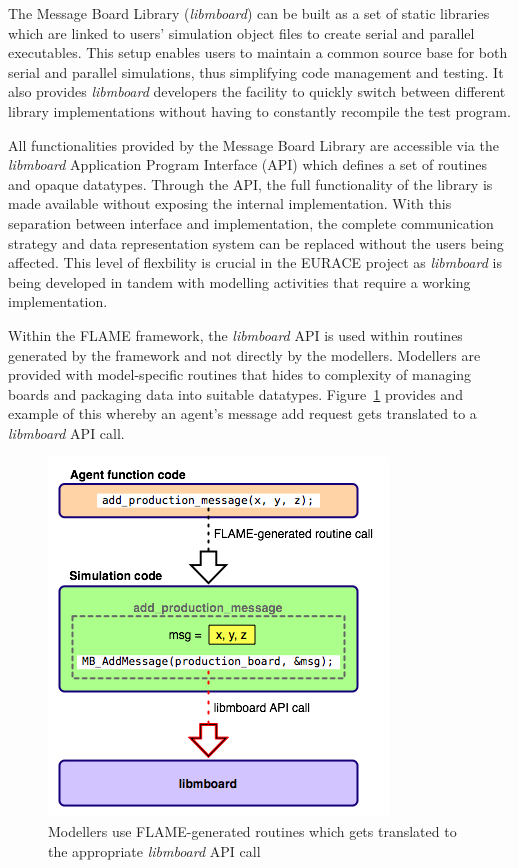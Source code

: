 The Message Board Library (\textit{libmboard}) can be built as a set of static libraries which are linked to users' simulation object files to create serial and parallel executables. This setup enables users to maintain a common source base for both serial and parallel simulations, thus simplifying code management and testing. It also provides \textit{libmboard} developers the facility to quickly switch between different library implementations without having to constantly recompile the test program.

All functionalities provided by the Message Board Library are accessible via the \textit{libmboard} Application Program Interface (API) which defines a set of routines and opaque datatypes. Through the API, the full functionality of the library is made available without exposing the internal implementation. With this separation between interface and implementation, the complete communication strategy and data representation system can be replaced without the users being affected. This level of flexbility is crucial in the EURACE project as \textit{libmboard} is being developed in tandem with modelling activities that require a working implementation.

Within the FLAME framework, the \textit{libmboard} API is used within routines generated by the framework and not directly by the modellers. Modellers are provided with model-specific routines that hides to complexity of managing boards and packaging data into suitable datatypes. Figure~\ref{fig:mb_api_flame} provides and example of this whereby an agent's message add request gets translated to a \textit{libmboard} API call.

\begin{figure}[h]
 \centering
  \includegraphics[scale=0.60]{mboard_codetranslate.png}
 \caption{Modellers use FLAME-generated routines which gets translated to the appropriate \textit{libmboard} API call}
 \label{fig:mb_api_flame}
\end{figure}






